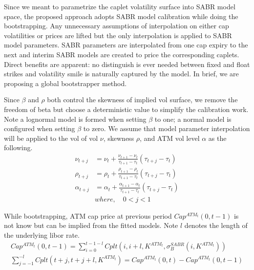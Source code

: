 \documentclass{article}
\begin{document}
Since we meant to parametrize the caplet volatility surface into SABR model space, the proposed approach adopts SABR model calibration while doing the bootstrapping.
Any unnecessary assumptions of interpolation on either cap volatilities or prices are lifted but the only interpolation is applied to SABR model parameters.
SABR parameters are interpolated from one cap expiry to the next and interim SABR models are created to price the corresponding caplets.
Direct benefits are apparent: no distinguish is ever needed between fixed and float strikes and volatility smile is naturally captured by the model.
In brief, we are proposing a global bootstrapper method.

Since $ \beta $ and $ \rho $ both control the skewness of implied vol surface, we remove the freedom of beta but choose a deterministic value to simplify the calibration work.
Note a lognormal model is formed when setting $ \beta $ to one; 
a normal model is configured when setting $ \beta $ to zero. 
We assume that model parameter interpolation will be applied to the vol of vol $ \nu $, skewness $ \rho $, and ATM vol level $ \alpha $ as the following.
\begin{subequations}
    \begin{align}
        \nu_{t + j} &= \nu_{t} + \frac{\nu_{t + 1} - \nu_{t}}{\tau_{t + 1} - \tau_t} \left(\tau_{t + j} - \tau_t\right) \\
        \rho_{t + j} &= \rho_{t} + \frac{\rho_{t + 1} - \rho_{t}}{\tau_{t + 1} - \tau_t} \left(\tau_{t + j} - \tau_t\right) \\
        \alpha_{t + j} &= \alpha_{t} + \frac{\alpha_{t + 1} - \alpha_{t}}{\tau_{t + 1} - \tau_t} \left(\tau_{t + j} - \tau_t\right) \\
        &where, \quad 0< j < 1 \nonumber
    \end{align}
\end{subequations}

While bootstrapping, ATM cap price at previous period  $ Cap^{ATM_{t}}{(0, t - 1)} $ is not know but can be implied from the fitted models.
Note $ l $ denotes the length of the underlying libor rate.
\begin{align}
    Cap^{ATM_{t}}{(0, t - 1)} = \sum_{i = 0}^{t - 1 - l}{Cplt\left(i, i + l, K^{ATM_{t}}, \sigma_{B}^{SABR}\left(i, K^{ATM_{t}}\right)\right)} \\
    \sum_{j = -1}^{- l}{Cplt(t + j, t + j + l, K^{ATM_{t}})} = Cap^{ATM_{t}}{(0, t)} - Cap^{ATM_{t}}{(0, t - 1)}
\end{align}
\end{document}
